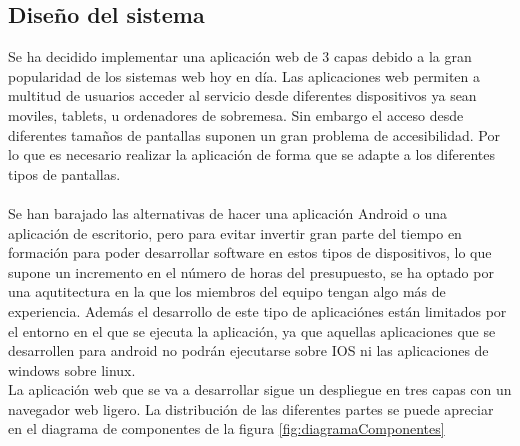 \subsection{Diseño del sistema}
Se ha decidido implementar una aplicación web de 3 capas debido a la gran popularidad de los sistemas web hoy en día. Las aplicaciones web permiten a multitud de usuarios acceder al servicio desde diferentes dispositivos ya sean moviles, tablets, u ordenadores de sobremesa. Sin embargo el acceso desde diferentes tamaños de pantallas suponen un gran problema de accesibilidad. Por lo que es necesario realizar la aplicación de forma que se adapte a los diferentes tipos de pantallas. \\
\\
Se han barajado las alternativas de hacer una aplicación Android o una aplicación de escritorio, pero para evitar invertir gran parte del tiempo en formación para poder desarrollar software en estos tipos de dispositivos, lo que supone un incremento en el número de horas del presupuesto, se ha optado por una aqutitectura en la que los miembros del equipo tengan algo más de experiencia. Además el desarrollo de este tipo de aplicaciónes están limitados por el entorno en el que se ejecuta la aplicación, ya que aquellas aplicaciones que se desarrollen para android no podrán ejecutarse sobre IOS ni las aplicaciones de windows sobre linux.
\\
La aplicación web que se va a desarrollar sigue un despliegue en tres capas con un navegador web ligero. La distribución de las diferentes partes se puede apreciar en el diagrama de componentes de la figura \ref{fig:diagramaComponentes}

